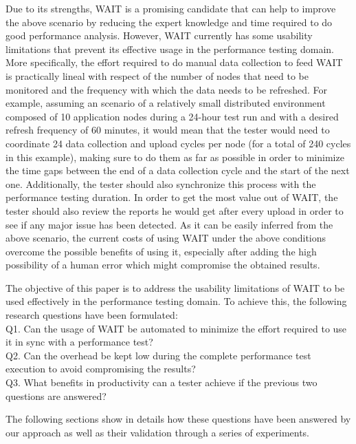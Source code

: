 \documentclass[runningheads,a4paper]{llncs}
\begin{document}
Due to its strengths, WAIT is a promising candidate that can help to improve the
above scenario by reducing the expert knowledge and time required to do good
performance analysis. However, WAIT currently has some usability limitations
that prevent its effective usage in the performance testing domain. More
specifically, the effort required to do manual data collection to feed WAIT is
practically lineal with respect of the number of nodes that need to be monitored
and the frequency with which the data needs to be refreshed. For example,
assuming an scenario of a relatively small distributed environment composed
of 10 application nodes during a 24-hour test run and with a desired refresh
frequency of 60 minutes, it would mean that the tester would need to coordinate 
24 data collection and upload cycles per node (for a total of 240
cycles in this example), making sure to do them as far as possible in order to
minimize the time gaps between the end of a data collection cycle and the
start of the next one. Additionally, the tester should also synchronize this
process with the performance testing duration. In order to get the most value
out of WAIT, the tester should also review the reports he would get after every 
upload in order to see if any major issue has been detected. As it can be easily inferred from
the above scenario, the current costs of using WAIT under the above conditions
overcome the possible benefits of using it, especially after adding the high
possibility of a human error which might compromise the obtained results.

The objective of this paper is to address the usability limitations of WAIT to
be used effectively in the performance testing domain. To achieve this, the
following research questions have been formulated:
\\Q1. Can the usage of WAIT be automated to minimize the effort
required to use it in sync with a performance test?
\\Q2. Can the overhead be kept low during the complete performance test
execution to avoid compromising the results? 
\\Q3. What benefits in productivity can a tester achieve if the previous
two questions are answered?

The following sections show in details how these questions have been answered by
our approach as well as their validation through a series of experiments.

\end{document}
